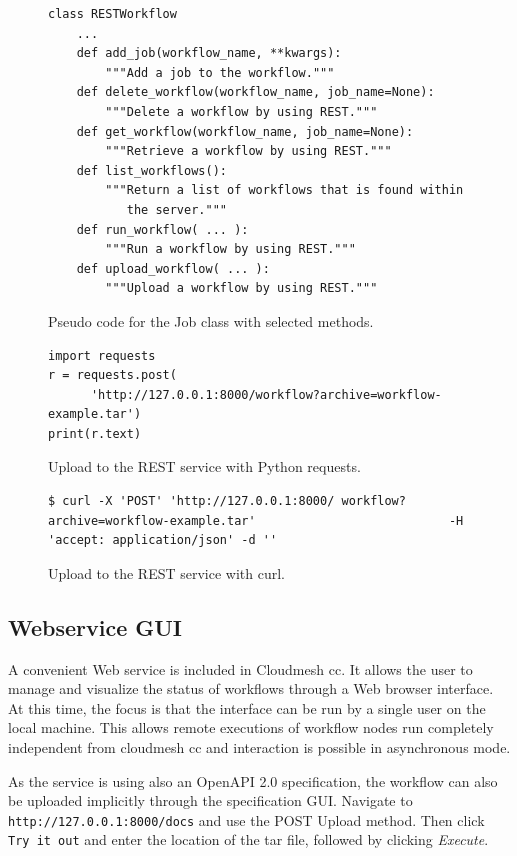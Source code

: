 \begin{figure}[t]
\begin{verbatim}
class RESTWorkflow
    ...
    def add_job(workflow_name, **kwargs):
        """Add a job to the workflow."""
    def delete_workflow(workflow_name, job_name=None):
        """Delete a workflow by using REST."""
    def get_workflow(workflow_name, job_name=None):
        """Retrieve a workflow by using REST."""
    def list_workflows():
        """Return a list of workflows that is found within
           the server."""
    def run_workflow( ... ):
        """Run a workflow by using REST."""
    def upload_workflow( ... ):
        """Upload a workflow by using REST."""
\end{verbatim}
\caption{Pseudo code for the Job class with selected methods.}
\label{fig:code-workflow-rest-commandline}

\bigskip

\begin{verbatim}
import requests
r = requests.post(
      'http://127.0.0.1:8000/workflow?archive=workflow-example.tar')
print(r.text)
\end{verbatim}
\caption{Upload to the REST service with Python requests.}
\label{fig:code-workflow-requests}

\bigskip

\begin{verbatim}
$ curl -X 'POST' 'http://127.0.0.1:8000/ workflow?archive=workflow-example.tar'                           -H 'accept: application/json' -d ''
\end{verbatim}
\caption{Upload to the REST service with curl.}
\label{fig:code-workflow-curl}

\end{figure}


\subsection{Webservice GUI}

A convenient Web service is included in Cloudmesh cc. It allows the user
to manage and visualize the status of workflows through a Web browser
interface. At this time, the focus is that the interface can be run by a
single user on the local machine. This allows remote executions of
workflow nodes run completely independent from cloudmesh cc and
interaction is possible in asynchronous mode.

As the service is using also an OpenAPI 2.0 specification, the workflow
can also be uploaded implicitly through the specification GUI. Navigate to
{\scriptsize \texttt{http://127.0.0.1:8000/docs}} and use the POST Upload
method. Then click \texttt{Try\ it\ out} and enter the location of the tar
file, followed by clicking {\em Execute}.


